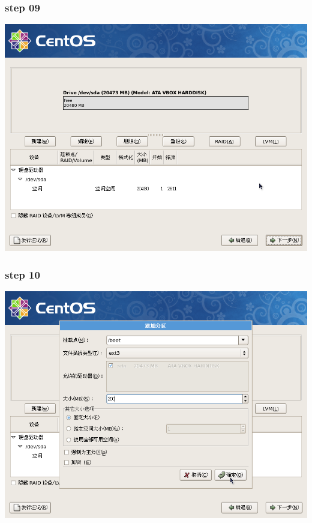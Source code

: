 \documentclass[xcolor=svgnames,presentation]{beamer}
\begin{document}
\begin{frame}
\frametitle{step 09}
\label{sec-2-9}

\begin{center}
\includegraphics[width=.9\linewidth]{img/img15.png}
\end{center}
\end{frame}
\begin{frame}
\frametitle{step 10}
\label{sec-2-10}

\begin{center}
\includegraphics[width=.9\linewidth]{img/img16.png}
\end{center}
\end{frame}
\end{document}
